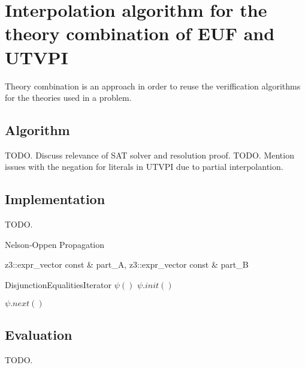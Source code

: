 \chapter{Interpolation algorithm for the theory combination of EUF and UTVPI}

Theory combination is an approach in order to reuse the veriffication algorithms
for the theories used in a problem.  

\section{Algorithm}

TODO. Discuss relevance of SAT solver and resolution proof. 
TODO. Mention issues with the negation for literals in UTVPI due to partial interpolantion.

\section{Implementation}

TODO.

\begin{algorithm}
  \caption{ Nelson-Oppen Propagation }
  \linespread{\separationline}\selectfont
  \begin{algorithmic}[2]
     { z3::expr\_vector const \& part\_A, z3::expr\_vector const \& part\_B }


    \State DisjunctionEqualitiesIterator $\psi()$
    \State $\psi.init()$

    \EndIf
    \EndIf


    \Else
    \EndIf

    \Else

    \Else
    \EndIf

    \EndIf

    \State $\psi.next()$

    \EndWhile

    \EndProcedure
  \end{algorithmic}
\end{algorithm}

\section{Evaluation}
TODO.

